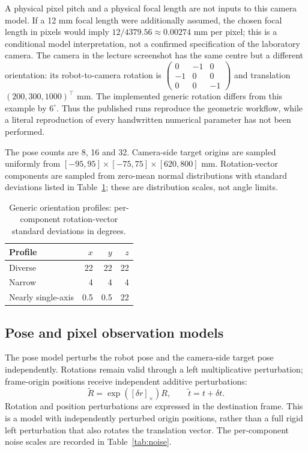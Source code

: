 \documentclass[12pt,a4paper]{article}
\newcommand{\crossmat}[1]{[#1]_{\times}}
\begin{document}
A physical pixel pitch and a physical focal length are not inputs to this camera model. If a 12 mm focal length were additionally assumed, the chosen focal length in pixels would imply $12/4379.56\approx0.00274$ mm per pixel; this is a conditional model interpretation, not a confirmed specification of the laboratory camera. The camera in the lecture screenshot has the same centre but a different orientation: its robot-to-camera rotation is $\left(\begin{smallmatrix}0&-1&0\\-1&0&0\\0&0&-1\end{smallmatrix}\right)$ and translation $(200,300,1000)^\top$ mm. The implemented generic rotation differs from this example by $6^\circ$. Thus the published runs reproduce the geometric workflow, while a literal reproduction of every handwritten numerical parameter has not been performed. \cite{lectureplan,experimentcode}

The pose counts are 8, 16 and 32. Camera-side target origins are sampled uniformly from $[-95,95]\times[-75,75]\times[620,800]$ mm. Rotation-vector components are sampled from zero-mean normal distributions with standard deviations listed in Table~\ref{tab:profiles}; these are distribution scales, not angle limits. \cite{experimentcode}
\begin{table}[!htbp]\centering\small
\caption{Generic orientation profiles: per-component rotation-vector standard deviations in degrees.}\label{tab:profiles}
\begin{tabular}{lrrr}\toprule
Profile & $x$ & $y$ & $z$\\\midrule
Diverse & 22 & 22 & 22\\
Narrow & 4 & 4 & 4\\
Nearly single-axis & 0.5 & 0.5 & 22\\\bottomrule
\end{tabular}
\end{table}

\subsection{Pose and pixel observation models}
The pose model perturbs the robot pose and the camera-side target pose independently. Rotations remain valid through a left multiplicative perturbation; frame-origin positions receive independent additive perturbations:
\begin{equation}\label{eq:noise}
\widetilde R=\exp(\crossmat{\delta r})R,\qquad
\widetilde t=t+\delta t.
\end{equation}
Rotation and position perturbations are expressed in the destination frame. This is a model with independently perturbed origin positions, rather than a full rigid left perturbation that also rotates the translation vector. The per-component noise scales are recorded in Table~\ref{tab:noise}. \cite{experimentcode,opencv}
\end{document}
